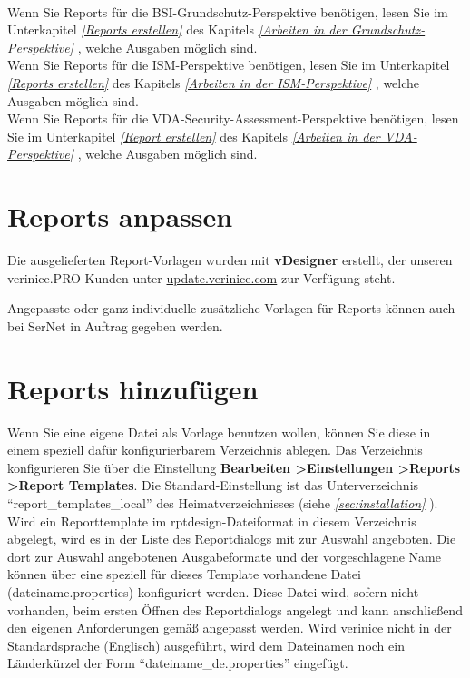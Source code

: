 \documentclass[a4paper,10pt]{book}
\begin{document}
\newline\\
Wenn Sie Reports für die BSI-Grundschutz-Perspektive benötigen, lesen Sie im Unterkapitel {\em \ref {Reports erstellen} } des Kapitels
{\em \ref{Arbeiten in der Grundschutz-Perspektive} }, welche Ausgaben möglich sind.
\newline\\
Wenn Sie Reports für die ISM-Perspektive benötigen, lesen Sie im Unterkapitel {\em \ref{Reports erstellen} } des Kapitels
{\em \ref{Arbeiten in der ISM-Perspektive} }, welche Ausgaben möglich sind.
\newline\\
Wenn Sie Reports für die VDA-Security-Assessment-Perspektive benötigen, lesen Sie im Unterkapitel {\em \ref{Report erstellen} } des
Kapitels {\em \ref{Arbeiten in der VDA-Perspektive} }, welche Ausgaben möglich sind.

\section{Reports anpassen}
Die ausgelieferten Report-Vorlagen wurden mit \textbf{vDesigner}
erstellt, der unseren verinice.PRO-Kunden unter
\href{https://update.verinice.com}{update.verinice.com} zur Verfügung
steht.

Angepasste oder ganz individuelle zusätzliche Vorlagen für Reports
können auch bei SerNet in Auftrag gegeben werden.

\section{Reports hinzufügen}
\label{sec:reports-hinzufuegen}


Wenn Sie eine eigene Datei als Vorlage benutzen wollen, können Sie
diese in einem speziell dafür konfigurierbarem Verzeichnis
ablegen. Das Verzeichnis konfigurieren Sie über die Einstellung
\textbf{Bearbeiten \textgreater Einstellungen \textgreater Reports
  \textgreater Report Templates}. Die Standard-Einstellung ist das
Unterverzeichnis ``report\_templates\_local'' des Heimatverzeichnisses
(siehe {\em \ref{sec:installation} }).  Wird
ein Reporttemplate im rptdesign-Dateiformat in diesem Verzeichnis
abgelegt, wird es in der Liste des Reportdialogs mit zur Auswahl
angeboten. Die dort zur Auswahl angebotenen Ausgabeformate und der
vorgeschlagene Name können über eine speziell für dieses Template
vorhandene Datei (dateiname.properties) konfiguriert werden. Diese
Datei wird, sofern nicht vorhanden, beim ersten Öffnen des
Reportdialogs angelegt und kann anschließend den eigenen Anforderungen
gemäß angepasst werden. Wird verinice nicht in der Standardsprache
(Englisch) ausgeführt, wird dem Dateinamen noch ein Länderkürzel
der Form ``dateiname\_de.properties'' eingefügt.\\
\end{document}
